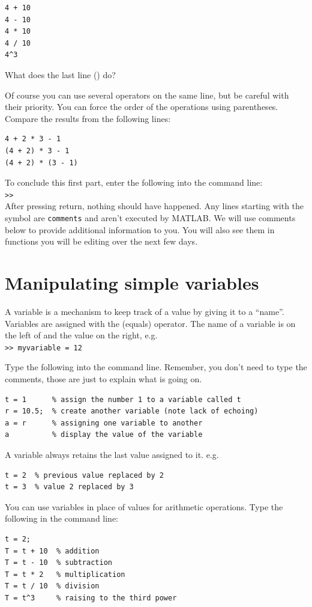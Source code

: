 \documentclass{article}
\begin{document}
\begin{lstlisting}
4 + 10
4 - 10
4 * 10
4 / 10
4^3
\end{lstlisting}
What does the last line () do?

Of course you can use several operators on the same line, but be careful with their priority.
You can force the order of the operations using parentheses.
Compare the results from the following lines:
\begin{lstlisting}
4 + 2 * 3 - 1
(4 + 2) * 3 - 1
(4 + 2) * (3 - 1)
\end{lstlisting}

To conclude this first part, enter the following into the command line: \\
\verb|>>|  \\
After pressing return, nothing should have happened.
Any lines starting with the \mcode{\%} symbol are \verb|comments| and aren't executed by MATLAB.
We will use comments below to provide additional information to you.
You will also see them in functions you will be editing over the next few days.


\section{Manipulating simple variables}

A variable is a mechanism to keep track of a value by giving it to a ``name''.
Variables are assigned with the \mcode{=} (equals) operator.
The name of a variable is on the left of \mcode{=} and the value on the right, e.g.\\
\verb|>> myvariable = 12|

Type the following into the command line.
Remember, you don't need to type the comments, those are just to explain what is going on.
\begin{lstlisting}
t = 1      % assign the number 1 to a variable called t
r = 10.5;  % create another variable (note lack of echoing)
a = r      % assigning one variable to another
a          % display the value of the variable
\end{lstlisting}

A variable always retains the last value assigned to it. e.g.
\begin{lstlisting}
t = 2  % previous value replaced by 2
t = 3  % value 2 replaced by 3
\end{lstlisting}

You can use variables in place of values for arithmetic operations.
Type the following in the command line:
\begin{lstlisting}
t = 2;
T = t + 10  % addition
T = t - 10  % subtraction
T = t * 2   % multiplication
T = t / 10  % division
T = t^3     % raising to the third power
\end{lstlisting}
\end{document}
